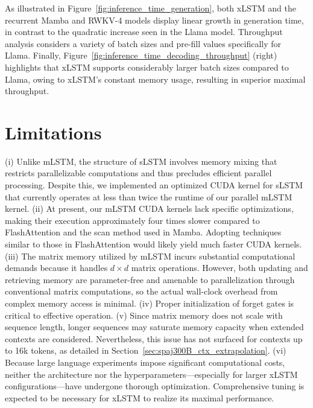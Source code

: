 As illustrated in Figure~\ref{fig:inference_time_generation}, both xLSTM and the recurrent Mamba and RWKV-4 models display linear growth in generation time, in contrast to the quadratic increase seen in the Llama model. Throughput analysis considers a variety of batch sizes and pre-fill values specifically for Llama. Finally, Figure~\ref{fig:inference_time_decoding_throughput} (right) highlights that xLSTM supports considerably larger batch sizes compared to Llama, owing to xLSTM's constant memory usage, resulting in superior maximal throughput.

\section{Limitations}

(i) Unlike mLSTM, the structure of sLSTM involves memory mixing that restricts parallelizable computations and thus precludes efficient parallel processing. Despite this, we implemented an optimized CUDA kernel for sLSTM that currently operates at less than twice the runtime of our parallel mLSTM kernel. (ii) At present, our mLSTM CUDA kernels lack specific optimizations, making their execution approximately four times slower compared to FlashAttention and the scan method used in Mamba. Adopting techniques similar to those in FlashAttention would likely yield much faster CUDA kernels. (iii) The matrix memory utilized by mLSTM incurs substantial computational demands because it handles $d \times d$ matrix operations. However, both updating and retrieving memory are parameter-free and amenable to parallelization through conventional matrix computations, so the actual wall-clock overhead from complex memory access is minimal. (iv) Proper initialization of forget gates is critical to effective operation. (v) Since matrix memory does not scale with sequence length, longer sequences may saturate memory capacity when extended contexts are considered. Nevertheless, this issue has not surfaced for contexts up to 16k tokens, as detailed in Section~\ref{sec:spaj300B_ctx_extrapolation}. (vi) Because large language experiments impose significant computational costs, neither the architecture nor the hyperparameters—especially for larger xLSTM configurations—have undergone thorough optimization. Comprehensive tuning is expected to be necessary for xLSTM to realize its maximal performance.

